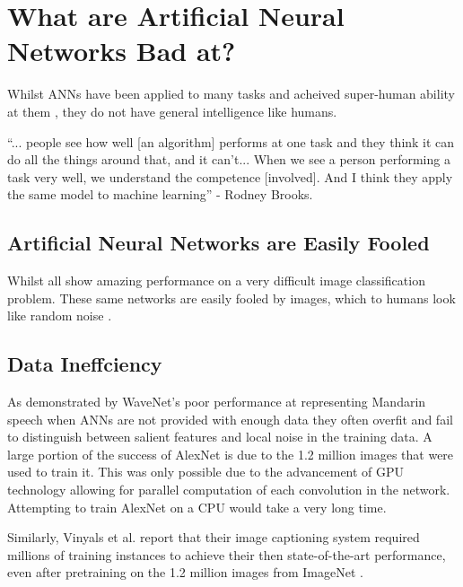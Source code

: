 \section{What are Artificial Neural Networks Bad at?}
Whilst ANNs have been applied to many tasks and acheived super-human ability at them \cite{vinyals2019alphastar}, they do not have general intelligence like humans.

\begin{displayquote}
``... people see how well [an algorithm] performs at one task and they think it can do all the things around that, and it can’t... When we see a person performing a task very well, we understand the competence [involved]. And I think they apply the same model to machine learning'' - Rodney Brooks.
\end{displayquote}

\subsection{Artificial Neural Networks are Easily Fooled}
Whilst \cite{krizhevsky2012imagenet, simonyan2014very, szegedy2015going, szegedy2016rethinking, szegedy2017inception, he2016deep, huang2017densely, russakovsky2015imagenet, chiu2018state, eslami2018neural} all show amazing performance on a very difficult image classification problem. These same networks are easily fooled by images, which to humans look like random noise \cite{nguyen2015deep}.


\subsection{Data Ineffciency}
As demonstrated by WaveNet's poor performance at representing Mandarin speech \cite{wavenet} when \ac{ANN}s are not provided with enough data they often overfit and fail to distinguish between salient features and local noise in the training data. A large portion of the success of AlexNet \cite{krizhevsky2012imagenet} is due to the 1.2 million images that were used to train it. This was only possible due to the advancement of \ac{GPU} technology allowing for parallel computation of each convolution in the network. Attempting to train AlexNet on a \ac{CPU} would take a very long time.

Similarly, Vinyals et al. \cite{vinyals2015show} report that their image captioning system required millions of training instances to achieve their then state-of-the-art performance, even after pretraining on the 1.2 million images from ImageNet \cite{ImNet}.


